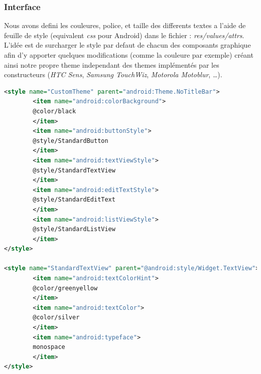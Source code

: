 \subsubsection{Interface}
Nous avons defini les couleures, police, et taille des differents textes a
l'aide de feuille de style (equivalent \textit{css} pour Android) dans le
fichier : \textit{res/values/attrs}. L'idée est de surcharger le style par
defaut de chacun des composants graphique afin d'y apporter quelques
modifications (comme la couleure par exemple) créant ainsi notre propre theme
independant des themes implémentés par les constructeurs (\textit{HTC Sens},
\textit{Samsung TouchWiz}, \textit{Motorola Motoblur}, \ldots).
\begin{lstlisting}[language=XML, format=XML]
<style name="CustomTheme" parent="android:Theme.NoTitleBar">
		<item name="android:colorBackground">
		@color/black
		</item>
		<item name="android:buttonStyle">
		@style/StandardButton
		</item>
		<item name="android:textViewStyle">
		@style/StandardTextView
		</item>
		<item name="android:editTextStyle">
		@style/StandardEditText
		</item>
		<item name="android:listViewStyle">
		@style/StandardListView
		</item>
</style>

<style name="StandardTextView" parent="@android:style/Widget.TextView">
		<item name="android:textColorHint">
		@color/greenyellow
		</item>
		<item name="android:textColor">
		@color/silver
		</item>
		<item name="android:typeface">
		monospace
		</item>
</style>
\end{lstlisting}

